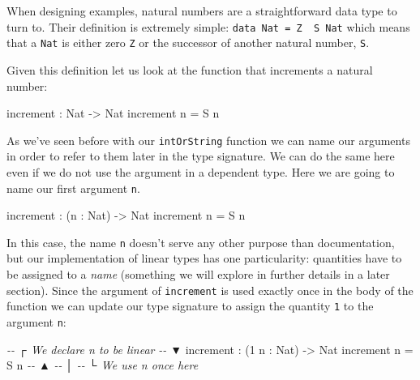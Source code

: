 \documentclass[
]{article}
\newenvironment{Shaded}{}{}
\newcommand{\CommentTok}[1]{\textcolor[rgb]{0.38,0.63,0.69}{\textit{#1}}}
\newcommand{\DataTypeTok}[1]{\textcolor[rgb]{0.56,0.13,0.00}{#1}}
\newcommand{\DecValTok}[1]{\textcolor[rgb]{0.25,0.63,0.44}{#1}}
\newcommand{\NormalTok}[1]{#1}
\newcommand{\OperatorTok}[1]{\textcolor[rgb]{0.40,0.40,0.40}{#1}}
\newcommand{\OtherTok}[1]{\textcolor[rgb]{0.00,0.44,0.13}{#1}}
\begin{document}
When designing examples, natural numbers are a straightforward data type
to turn to. Their definition is extremely simple:
\texttt{data\ Nat\ =\ Z\ \textbar{}\ S\ Nat} which means that a
\texttt{Nat} is either zero \texttt{Z} or the successor of another
natural number, \texttt{S}.

Given this definition let us look at the function that increments a
natural number:

\begin{Shaded}
\begin{Highlighting}[]
\NormalTok{increment }\OperatorTok{:} \DataTypeTok{Nat} \OtherTok{{-}\textgreater{}} \DataTypeTok{Nat}
\NormalTok{increment n }\OtherTok{=} \DataTypeTok{S}\NormalTok{ n}
\end{Highlighting}
\end{Shaded}

As we've seen before with our \texttt{intOrString} function we can name
our arguments in order to refer to them later in the type signature. We
can do the same here even if we do not use the argument in a dependent
type. Here we are going to name our first argument \texttt{n}.

\begin{Shaded}
\begin{Highlighting}[]
\NormalTok{increment }\OperatorTok{:}\NormalTok{ (n }\OperatorTok{:} \DataTypeTok{Nat}\NormalTok{) }\OtherTok{{-}\textgreater{}} \DataTypeTok{Nat}
\NormalTok{increment n }\OtherTok{=} \DataTypeTok{S}\NormalTok{ n}
\end{Highlighting}
\end{Shaded}

In this case, the name \texttt{n} doesn't serve any other purpose than
documentation, but our implementation of linear types has one
particularity: quantities have to be assigned to a \emph{name}
(something we will explore in further details in a later section). Since
the argument of \texttt{increment} is used exactly once in the body of
the function we can update our type signature to assign the quantity
\texttt{1} to the argument \texttt{n}:

\begin{Shaded}
\begin{Highlighting}[]
\CommentTok{{-}{-}           ┌ We declare \textasciigrave{}n\textasciigrave{} to be linear}
\CommentTok{{-}{-}           ▼}
\NormalTok{increment }\OperatorTok{:}\NormalTok{ (}\DecValTok{1}\NormalTok{ n }\OperatorTok{:} \DataTypeTok{Nat}\NormalTok{) }\OtherTok{{-}\textgreater{}} \DataTypeTok{Nat}
\NormalTok{increment n }\OtherTok{=} \DataTypeTok{S}\NormalTok{ n}
\CommentTok{{-}{-}              ▲}
\CommentTok{{-}{-}              │}
\CommentTok{{-}{-}              └ We use n once here}
\end{Highlighting}
\end{Shaded}
\end{document}

